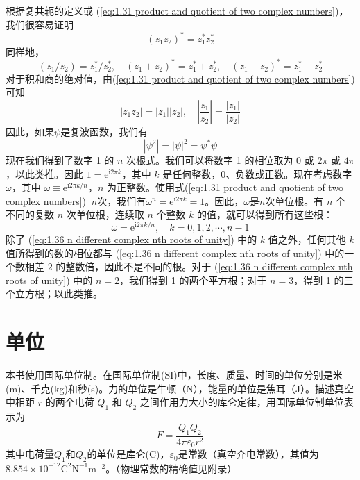 	\indent 根据复共轭的定义或 (\ref{eq:1.31 product and quotient of two complex numbers})，我们很容易证明
	\begin{equation}
		\boxed{\left(z_1z_2\right)^{\ast} = z_1^{\ast} z_2^{\ast}}
		\label{eq:1.32 properties of complex conjugate}
	\end{equation}
	同样地，
	\begin{equation}
		\boxed{
				\left(z_1/z_2\right) = z_1^{\ast} / z_2^{\ast}, \quad \left(z_1+z_2\right)^{\ast} = z_1^{\ast} + z_2^{\ast} , \quad \left(z_1-z_2\right)^{\ast} = z_1^{\ast} - z_2^{\ast}}
		\label{eq:1.33 linear properties of complex conjugate
		}
	\end{equation}
	对于积和商的绝对值，由(\ref{eq:1.31 product and quotient of two complex numbers})可知
	\begin{equation}
		\left|z_1z_2\right|=\left|z_1\right|\left|z_2\right|, \quad \left|\frac{z_1}{z_2}\right| = \frac{\left|z_1\right|}{\left|z_2\right|}
		\label{eq:1.34 properties of product and quotient absolute values}
	\end{equation}
	因此，如果$\psi$是复波函数，我们有
	\begin{equation}
		\left|\psi^2\right| = \left|\psi\right|^2 = \psi^{\ast} \psi
		\label{eq:1.35 properties of psi wave function}
	\end{equation}
	\indent 现在我们得到了数字 1 的 $n$ 次根式。我们可以将数字 1 的相位取为 0 或 $2\pi$ 或 $4\pi$，以此类推。因此 $1 = \mathrm{e}^{\mathrm{i}2\pi k}$，其中 $k$ 是任何整数，0、负数或正数。现在考虑数字 $\omega$，其中 $\omega \equiv \mathrm{e}^{\mathrm{i} 2\pi k /n}$，$n$ 为正整数。使用式(\ref{eq:1.31 product and quotient of two complex numbers}) $\:$$n$次，我们有$\omega^n = \mathrm{e}^{\mathrm{i}2\pi k} = 1$。因此，$\omega$是$n$次单位根。有 $n$ 个不同的复数 $n$ 次单位根，连续取 $n$ 个整数 $k$ 的值，就可以得到所有这些根：
	\begin{equation}
		\omega = \mathrm{e}^{\mathrm{i} 2\pi k /n}, \quad k = 0,1,2,\cdots , n-1
		\label{eq:1.36 n different complex nth roots of unity}
	\end{equation}
	除了 (\ref{eq:1.36 n different complex nth roots of unity}) 中的 $k$ 值之外，任何其他 $k$ 值所得到的数的相位都与 (\ref{eq:1.36 n different complex nth roots of unity}) 中的一个数相差 $2$ 的整数倍，因此不是不同的根。对于 (\ref{eq:1.36 n different complex nth roots of unity}) 中的 $n=2$，我们得到 1 的两个平方根；对于 $n=3$，得到 1 的三个立方根；以此类推。
	
	\section{单位}
	本书使用国际单位制。在国际单位制(SI)中，长度、质量、时间的单位分别是米(m)、千克(kg)和秒(s)。力的单位是牛顿（N），能量的单位是焦耳（J）。描述真空中相距 $r$ 的两个电荷 $Q_1$ 和 $Q_2$ 之间作用力大小的库仑定律，用国际单位制单位表示为
	\begin{equation}
		\boxed{F = \frac{Q_1Q_2}{4\pi \varepsilon_0r^2}}
		\label{eq:1.37 coulomb's law}
	\end{equation}
	其中电荷量$Q_1$和$Q_2$的单位是库仑(C)，$\varepsilon_0$是常数（真空介电常数），其值为$8.854 \times 10^{-12} \mathrm{C}^2\mathrm{N}^{-1}\mathrm{m}^{-2}$。（物理常数的精确值见附录）
	
